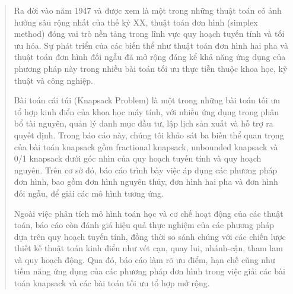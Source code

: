 \documentclass[fontsize=13pt,a4paper]{report}
\begin{document}
\coverpage

\secondcoverpage





 

\begin{abstract}
Ra đời vào năm 1947 và được xem là một trong những thuật toán có ảnh hưởng sâu rộng nhất của thế kỷ XX, thuật toán đơn hình (simplex method) đóng vai trò nền tảng trong lĩnh vực quy hoạch tuyến tính và tối ưu hóa. Sự phát triển của các biến thể như thuật toán đơn hình hai pha và thuật toán đơn hình đối ngẫu đã mở rộng đáng kể khả năng ứng dụng của phương pháp này trong nhiều bài toán tối ưu thực tiễn thuộc khoa học, kỹ thuật và công nghiệp.

Bài toán cái túi (Knapsack Problem) là một trong những bài toán tối ưu tổ hợp kinh điển của khoa học máy tính, với nhiều ứng dụng trong phân bổ tài nguyên, quản lý danh mục đầu tư, lập lịch sản xuất và hỗ trợ ra quyết định. Trong báo cáo này, chúng tôi khảo sát ba biến thể quan trọng của bài toán knapsack gồm fractional knapsack, unbounded knapsack và 0/1 knapsack dưới góc nhìn của quy hoạch tuyến tính và quy hoạch nguyên. Trên cơ sở đó, báo cáo trình bày việc áp dụng các phương pháp đơn hình, bao gồm đơn hình nguyên thủy, đơn hình hai pha và đơn hình đối ngẫu, để giải các mô hình tương ứng.

Ngoài việc phân tích mô hình toán học và cơ chế hoạt động của các thuật toán, báo cáo còn đánh giá hiệu quả thực nghiệm của các phương pháp dựa trên quy hoạch tuyến tính, đồng thời so sánh chúng với các chiến lược thiết kế thuật toán kinh điển như vét cạn, quay lui, nhánh-cận, tham lam và quy hoạch động. Qua đó, báo cáo làm rõ ưu điểm, hạn chế cũng như tiềm năng ứng dụng của các phương pháp đơn hình trong việc giải các bài toán knapsack và các bài toán tối ưu tổ hợp mở rộng.
\end{abstract}
 
\end{document}
